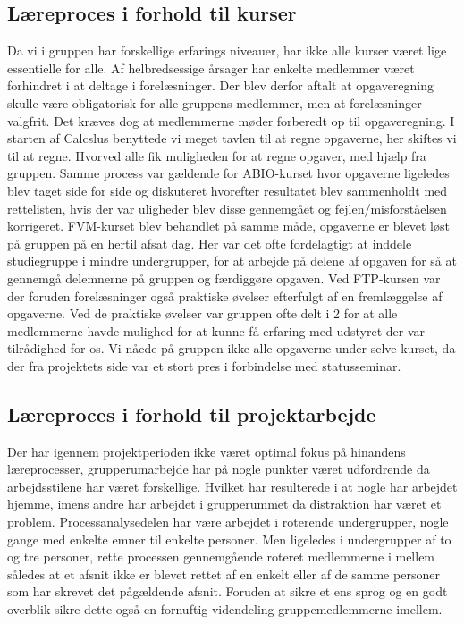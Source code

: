 \subsection{Læreproces i forhold til kurser}
Da vi i gruppen har forskellige erfarings niveauer, har ikke alle kurser været lige essentielle for alle. Af helbredsessige årsager har enkelte medlemmer været forhindret i at deltage i forelæsninger. Der blev derfor aftalt at opgaveregning skulle være obligatorisk for alle gruppens medlemmer, men at forelæsninger valgfrit. Det kræves dog at medlemmerne møder forberedt op til opgaveregning. I starten af Calcslus benyttede vi meget tavlen til at regne opgaverne, her skiftes vi til at regne. Hvorved alle fik muligheden for at regne opgaver, med hjælp fra gruppen. Samme process var gældende for ABIO-kurset hvor opgaverne ligeledes blev taget side for side og diskuteret hvorefter resultatet blev sammenholdt med rettelisten, hvis der var uligheder blev disse gennemgået og fejlen/misforståelsen korrigeret.
FVM-kurset blev behandlet på samme måde, opgaverne er blevet løst på gruppen på en hertil afsat dag. Her var det ofte fordelagtigt at inddele studiegruppe i mindre undergrupper, for at arbejde på delene af opgaven for så at gennemgå delemnerne på gruppen og færdiggøre opgaven. Ved FTP-kursen var der foruden forelæsninger også praktiske øvelser efterfulgt af en fremlæggelse af opgaverne. Ved de praktiske øvelser var gruppen ofte delt i 2 for at alle medlemmerne havde mulighed for at kunne få erfaring med udstyret der var tilrådighed for os. Vi nåede på gruppen ikke alle opgaverne under selve kurset, da der fra projektets side var et stort pres i forbindelse med statusseminar.  
\subsection{Læreproces i forhold til projektarbejde}
Der har igennem projektperioden ikke været optimal fokus på hinandens læreprocesser, grupperumarbejde har på nogle punkter været udfordrende da arbejdsstilene har været forskellige. Hvilket har resulterede i at nogle har arbejdet hjemme, imens andre har arbejdet i grupperummet da distraktion har været et problem. Processanalysedelen har være arbejdet i roterende undergrupper, nogle gange med enkelte emner til enkelte personer. Men ligeledes i undergrupper af to og tre personer, rette processen gennemgående roteret medlemmerne i mellem således at et afsnit ikke er blevet rettet af en enkelt eller af de samme personer som har skrevet det pågældende afsnit. Foruden at sikre et ens sprog og en godt overblik sikre dette også en fornuftig videndeling gruppemedlemmerne imellem. 

